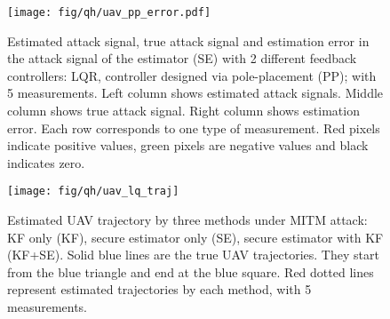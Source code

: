 \documentclass[twocolumn]{autart}    %
\newcommand{\qie}[1]{{\normalsize{{{\color{magenta}#1}}}}}
\begin{document}
\begin{figure}
\center
\texttt{[image: fig/qh/uav\_pp\_error.pdf]}
\caption{Estimated attack signal, true attack signal and estimation error in the attack signal of the estimator (SE) with 2 different feedback controllers: LQR, controller designed via pole-placement (PP); with 5 measurements. Left column shows estimated attack signals. Middle column shows true attack signal. Right column shows estimation error. Each row corresponds to one type of measurement. Red pixels indicate positive values, green pixels are negative values and black indicates zero. }
\label{fig:ex_pp_err}
\end{figure}

\begin{figure}
\center
\texttt{[image: fig/qh/uav\_lq\_traj]}
\caption{Estimated UAV trajectory by three methods under MITM attack: KF only (KF), secure estimator only (SE), secure estimator with KF (KF+SE). Solid blue lines are the true UAV trajectories. They start from the blue triangle and end at the blue square. Red dotted lines represent estimated trajectories by each method, with 5 measurements.}
\label{fig:ex_uav_remote}
\end{figure}
\vspace{-0.4cm}
\end{document}
